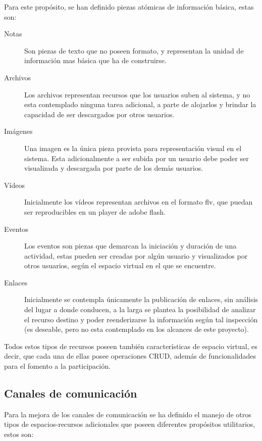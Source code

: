 Para este propósito, se han definido piezas atómicas de información básica,
estas son:

\begin{description}
\item [Notas] Son piezas de texto que no poseen formato, y representan la unidad
de información mas básica que ha de construirse.
\item [Archivos] Los archivos representan recursos que los usuarios suben al
sistema, y no esta contemplado ninguna tarea adicional, a parte de alojarlos y
brindar la capacidad de ser descargados por otros usuarios.
\item [Imágenes] Una imagen es la única pieza provista para representación
visual en el sistema. Esta adicionalmente a ser subida por un usuario debe
poder ser visualizada y descargada por parte de los demás usuarios.
\item [Vídeos] Inicialmente los vídeos representan archivos en el formato flv,
que puedan ser reproducibles en un player de adobe flash.
\item [Eventos] Los eventos son piezas que demarcan la iniciación y duración de
una actividad, estas pueden ser creadas por algún usuario y visualizados por
otros usuarios, según el espacio virtual en el que se encuentre.
\item [Enlaces] Inicialmente se contempla únicamente la publicación de enlaces,
sin análisis del lugar a donde conducen, a la larga se plantea la posibilidad de
analizar el recurso destino y poder reenderizarse la información según tal
inspección (es deseable, pero no esta contemplado en los alcances de este
proyecto).
\end{description}

Todos estos tipos de recursos poseen también características de espacio virtual,
es decir, que cada una de ellas posee operaciones CRUD, además de
funcionalidades para el fomento a la participación.

\subsection{Canales de comunicación}

Para la mejora de los canales de comunicación se ha definido el manejo de otros
tipos de espacios-recursos adicionales que poseen diferentes propósitos
utilitarios, estos son:

